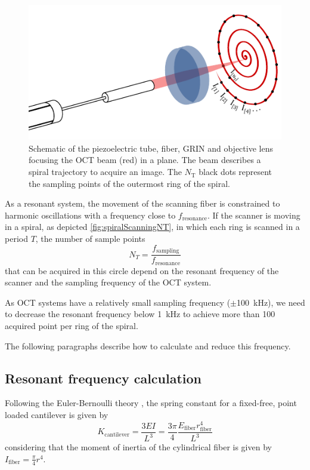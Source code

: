 \begin{figure}[h!]\centering
      \includegraphics[width=12cm]{figures/30_DesignSimulation/Mechanical/spiralScanningNT.pdf}
      \caption{Schematic of the piezoelectric tube, fiber, GRIN and objective lens focusing the OCT beam (red) in a plane. The beam describes a spiral trajectory to acquire an image. The $N_\mathrm{T}$ black dots represent the sampling points of the outermost ring of the spiral.}
      \label{fig:spiralScanningNT}
\end{figure}

As a resonant system, the movement of the scanning fiber is constrained to harmonic oscillations with a frequency close to $f_\mathrm{resonance}$. If the scanner is moving in a spiral, as depicted \autoref{fig:spiralScanningNT}, in which each ring is scanned in a period $T$, the number of sample points 
\begin{equation}
N_{T} = \frac{f_\mathrm{sampling}}{f_\mathrm{resonance}}
\label{eq:nT}
\end{equation}
that can be acquired in this circle depend on the resonant frequency of the scanner and the sampling frequency of the OCT system.



As OCT systems have a relatively small sampling frequency ($\pm$\SI{100}{\kilo\hertz}), we need to decrease the resonant frequency below \SI{1}{kHz} to achieve more than 100 acquired point per ring of the spiral. 

The following paragraphs describe how to calculate and reduce this frequency.

\subsection{Resonant frequency calculation}
Following the Euler-Bernoulli theory \cite{MarcJ.Madou2011}, the spring constant for a fixed-free, point loaded cantilever is given by 
\begin{equation}
K_\mathrm{cantilever} = \frac{3 E I}{L^3} = \frac{3 \pi}{4} \frac{E_\mathrm{fiber} r_\mathrm{fiber}^4}{L^3}
\label{eq:EB}
\end{equation}
considering that the moment of inertia of the cylindrical fiber is given by $I_\mathrm{fiber} = \frac{\pi}{4} r^4$.

